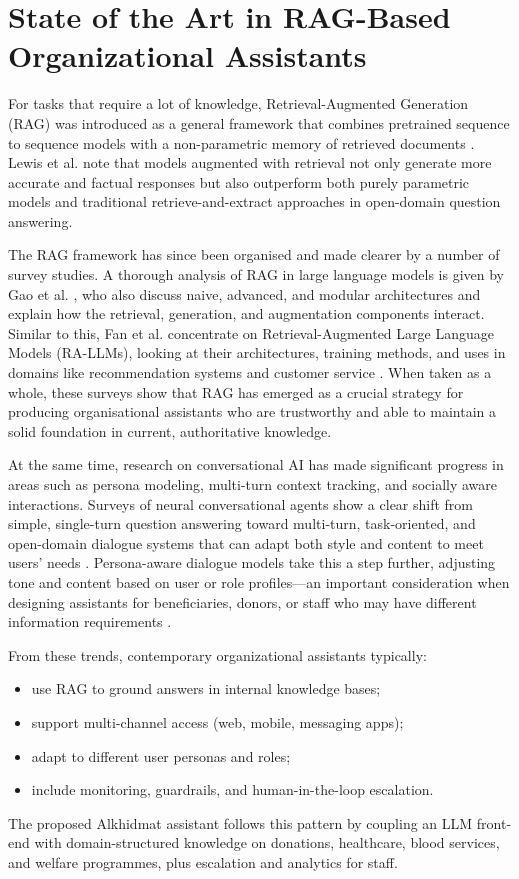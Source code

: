 \section{State of the Art in RAG-Based Organizational Assistants}
For tasks that require a lot of knowledge, Retrieval-Augmented Generation (RAG) was introduced as a general framework that combines pretrained sequence to sequence models with a non-parametric memory of retrieved documents \cite{lewis2020rag}. Lewis et al. note that models augmented with retrieval not only generate more accurate and factual responses but also outperform both purely parametric models and traditional retrieve-and-extract approaches in open-domain question answering.

The RAG framework has since been organised and made clearer by a number of survey studies.  A thorough analysis of RAG in large language models is given by Gao et al. \cite{gao2023ragsurvey}, who also discuss naive, advanced, and modular architectures and explain how the retrieval, generation, and augmentation components interact.  Similar to this, Fan et al. concentrate on Retrieval-Augmented Large Language Models (RA-LLMs), looking at their architectures, training methods, and uses in domains like recommendation systems and customer service \cite{fan2024ragllm}.  When taken as a whole, these surveys show that RAG has emerged as a crucial strategy for producing organisational assistants who are trustworthy and able to maintain a solid foundation in current, authoritative knowledge.

At the same time, research on conversational AI has made significant progress in areas such as persona modeling, multi-turn context tracking, and socially aware interactions. Surveys of neural conversational agents show a clear shift from simple, single-turn question answering toward multi-turn, task-oriented, and open-domain dialogue systems that can adapt both style and content to meet users’ needs \cite{kim2023convai}. Persona-aware dialogue models take this a step further, adjusting tone and content based on user or role profiles—an important consideration when designing assistants for beneficiaries, donors, or staff who may have different information requirements \cite{singh2024persona}.

From these trends, contemporary organizational assistants typically:
\begin{itemize}\setlength{\itemsep}{0pt}
    \item use RAG to ground answers in internal knowledge bases;
    \item support multi-channel access (web, mobile, messaging apps);
    \item adapt to different user personas and roles;
    \item include monitoring, guardrails, and human-in-the-loop escalation.
\end{itemize}
The proposed Alkhidmat assistant follows this pattern by coupling an LLM front-end with domain-structured knowledge on donations, healthcare, blood services, and welfare programmes, plus escalation and analytics for staff.

